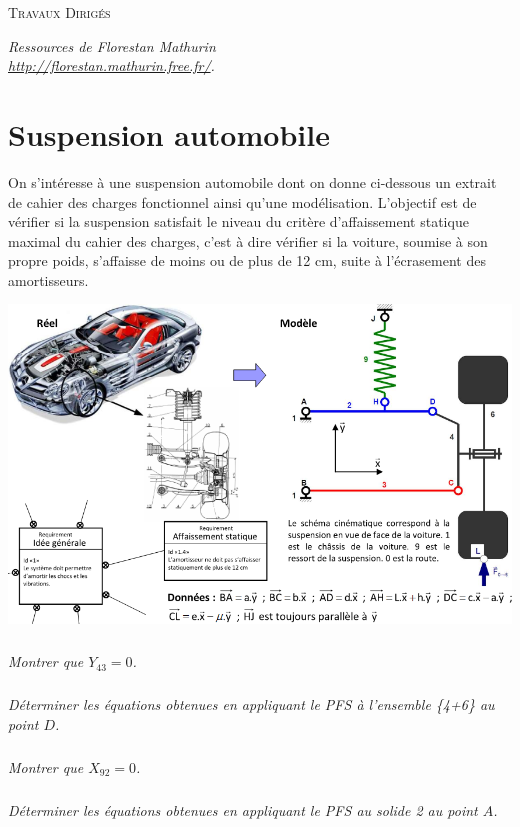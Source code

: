 \documentclass[10pt]{article}
\begin{document}

\begin{center}
\large{\textsc{Travaux Dirigés}}
\end{center}

\begin{flushright}
\textit{Ressources de Florestan Mathurin \\
\url{http://florestan.mathurin.free.fr/}.}
\end{flushright}



\section*{Suspension automobile}


On s'intéresse à une suspension automobile dont on donne ci-dessous un extrait de cahier des charges fonctionnel ainsi qu’une modélisation. L'objectif est de vérifier si la suspension satisfait le niveau du critère d'affaissement statique maximal du cahier des charges, c'est à dire vérifier si la voiture, soumise à son propre poids, s'affaisse de moins ou de plus de 12 cm, suite à l'écrasement des amortisseurs. 


\begin{center}
\includegraphics[width=.9\linewidth]{images/suspension}
\end{center}

\subparagraph{}
\textit{Montrer que $Y_{43} =0$.}

\subparagraph{}
\textit{Déterminer les équations obtenues en appliquant le PFS à l’ensemble \{4+6\} au point $D$.}

\subparagraph{}
\textit{Montrer que $X_{92} =0$.}

\subparagraph{}
\textit{Déterminer les équations obtenues en appliquant le PFS au solide 2 au point $A$.}
\end{document}
